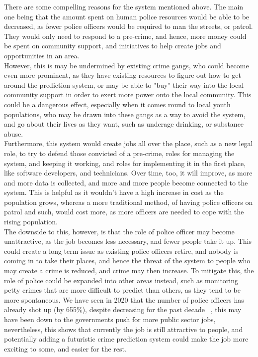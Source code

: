 
There are some compelling reasons for the system mentioned above.
The main one being that the amount spent on human police resources would be able to be decreased, as fewer
police officers would be required to man the streets, or patrol.
They would only need to respond to a pre-crime, and hence, more money could be spent on community support, and
initiatives to help create jobs and opportunities in an area.
\\

However, this is may be undermined by existing crime gangs, who could become even more prominent, as they have
existing resources to figure out how to get around the prediction system, or may be able to "buy" their way into
the local community support in order to exert more power onto the local community.
This could be a dangerous effect, especially when it comes round to local youth populations, who may be drawn into
these gangs as a way to avoid the system, and go about their lives as they want, such as underage drinking, or
substance abuse.
\\

Furthermore, this system would create jobs all over the place, such as a new legal role, to try to defend those
convicted of a pre-crime, roles for managing the system, and keeping it working, and roles for implementing it in
the first place, like software developers, and technicians.
Over time, too, it will improve, as more and more data is collected, and more and more people become connected to
the system.
This is helpful as it wouldn't have a high increase in cost as the population grows, whereas a more traditional
method, of having police officers on patrol and such, would cost more, as more officers are needed to cope with
the rising population.
\\

The downside to this, however, is that the role of police officer may become unattractive, as the job becomes less
necessary, and fewer people take it up.
This could create a long term issue as existing police officers retire, and nobody is coming in to take
their places, and hence the threat of the system to people who may create a crime is reduced, and crime may then
increase.
To mitigate this, the role of police could be expanded into other areas instead, such as monitoring petty crimes
that are more difficult to predict than others, as they tend to be more spontaneous.
We have seen in 2020 that the number of police officers has already shot up (by 655\%), despite decreasing
for the past decade ~\cite{ho-pw}, this may have been down to the governments push for more public sector jobs,
nevertheless, this shows that currently the job is still attractive to people, and potentially adding a futuristic
crime prediction system could make the job more exciting to some, and easier for the rest.